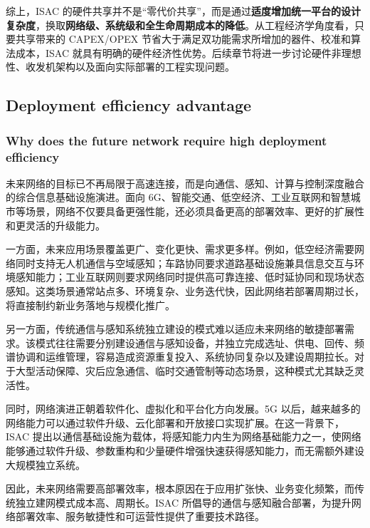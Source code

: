 综上，ISAC 的硬件共享并不是“零代价共享”，而是通过\textbf{适度增加统一平台的设计复杂度}，换取\textbf{网络级、系统级和全生命周期成本的降低}。从工程经济学角度看，只要共享带来的 CAPEX/OPEX 节省大于满足双功能需求所增加的器件、校准和算法成本，ISAC 就具有明确的硬件经济性优势。后续章节将进一步讨论硬件非理想性、收发机架构以及面向实际部署的工程实现问题。

\subsection{Deployment efficiency advantage}
\label{subsec:ch1-isac-core value-deployment}
\subsubsection{Why does the future network require high deployment efficiency}
\label{subsubsec:ch1-isac-core value-deployment-why}

未来网络的目标已不再局限于高速连接，而是向通信、感知、计算与控制深度融合的综合信息基础设施演进。面向 6G、智能交通、低空经济、工业互联网和智慧城市等场景，网络不仅要具备更强性能，还必须具备更高的部署效率、更好的扩展性和更灵活的升级能力。

一方面，未来应用场景覆盖更广、变化更快、需求更多样。例如，低空经济需要网络同时支持无人机通信与空域感知；车路协同要求道路基础设施兼具信息交互与环境感知能力；工业互联网则要求网络同时提供高可靠连接、低时延协同和现场状态感知\cite{Zhang2021ISAC6G, Feng2020JointRadarCommunication, Shafi20175G}。这类场景通常站点多、环境复杂、业务迭代快，因此网络若部署周期过长，将直接制约新业务落地与规模化推广。

另一方面，传统通信与感知系统独立建设的模式难以适应未来网络的敏捷部署需求。该模式往往需要分别建设通信与感知设备，并独立完成选址、供电、回传、频谱协调和运维管理，容易造成资源重复投入、系统协同复杂以及建设周期拉长。对于大型活动保障、灾后应急通信、临时交通管制等动态场景，这种模式尤其缺乏灵活性。

同时，网络演进正朝着软件化、虚拟化和平台化方向发展。5G 以后，越来越多的网络能力可以通过软件升级、云化部署和开放接口实现扩展\cite{Andrews2014, Letaief2019Roadmap}。在这一背景下，ISAC 提出以通信基础设施为载体，将感知能力内生为网络基础能力之一，使网络能够通过软件升级、参数重构和少量硬件增强快速获得感知能力，而无需额外建设大规模独立系统。

因此，未来网络需要高部署效率，根本原因在于应用扩张快、业务变化频繁，而传统独立建网模式成本高、周期长。ISAC 所倡导的通信与感知融合部署，为提升网络部署效率、服务敏捷性和可运营性提供了重要技术路径\cite{Liu2022ISAC, IMT2030Framework,ITU2030}。

